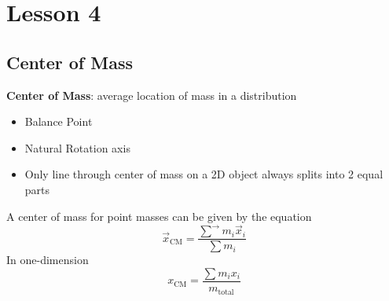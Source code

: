 \documentclass{article}
\begin{document}
\newcommand{\hr}{\par\noindent\rule{\textwidth}{0.4pt}}

\tableofcontents
\newpage

\section{Lesson 4}

% 
% 
% 
% 
% 

\subsection{Center of Mass}

\textbf{Center of Mass}: average location of mass in a distribution
\begin{itemize}[label=-]
    \item Balance Point
    \item Natural Rotation axis
    \item Only line through center of mass on a 2D object always splits into 2 equal parts
\end{itemize}
A center of mass for point masses can be given by the equation
$$ \vec{x}_{\text{CM}} = \frac{\vec{\sum}m_i\vec{x}_i}{\sum m_i} $$
In one-dimension
$$ x_{\text{CM}} = \frac{\sum m_ix_i}{m_{\text{total}}} $$

\end{document}

